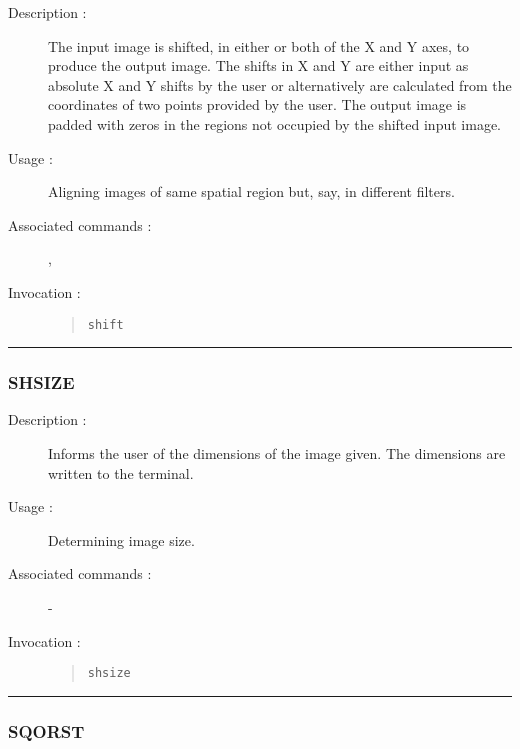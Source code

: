 \begin{description}

\item[Description :] The input image is shifted, in either or both of
the X and Y axes, to produce the output image. The shifts in X and Y
are either input as absolute X and Y shifts by the user or
alternatively are calculated from the coordinates of two points
provided by the user. The output image is padded with zeros in the
regions not occupied by the shifted input image.

\item[Usage :] Aligning images of same spatial region but, say, in different
filters.
\item[Associated commands :] {\tt {}}, 
{\tt {}}
\item[Invocation :]

\begin{quote}{\tt  shift }\end{quote}

\end{description}

\hrule 
\subsubsection*{\label{SHSIZE}SHSIZE}

\begin{description}

\item[Description :] Informs the user of the dimensions of the image
given.  The dimensions are written to the terminal.

\item[Usage :] Determining image size. 
\item[Associated commands :] -
\item[Invocation :]

\begin{quote}{\tt  shsize }\end{quote}

\end{description}

\hrule 
\subsubsection*{\label{SQORST}SQORST}

